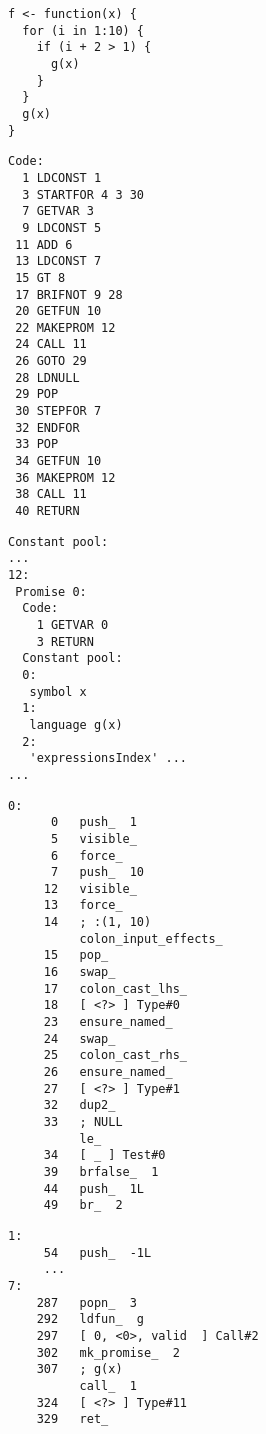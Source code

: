 \begin{listing}[p]
	\centering
		\begin{minipage}{0.33\textwidth}
			\begin{verbatim}
f <- function(x) {
  for (i in 1:10) {
    if (i + 2 > 1) {
      g(x)
    }
  }
  g(x)
}
    \end{verbatim}
			\label{lst:bc-example-r}
		\end{minipage}
		\hfill
    \begin{minipage}[t]{0.61\textwidth}
			\begin{minipage}{0.20\textwidth}
				\begin{verbatim}
Code:
  1 LDCONST 1
  3 STARTFOR 4 3 30
  7 GETVAR 3
  9 LDCONST 5
 11 ADD 6
 13 LDCONST 7
 15 GT 8
 17 BRIFNOT 9 28
 20 GETFUN 10
 22 MAKEPROM 12
 24 CALL 11
 26 GOTO 29
 28 LDNULL
 29 POP
 30 STEPFOR 7
 32 ENDFOR
 33 POP
 34 GETFUN 10
 36 MAKEPROM 12
 38 CALL 11
 40 RETURN
        \end{verbatim}
			\end{minipage}
			\hfill
      \begin{minipage}{0.40\textwidth}
				\begin{verbatim}
Constant pool:
...
12:
 Promise 0:
  Code:
    1 GETVAR 0
    3 RETURN
  Constant pool:
  0:
   symbol x
  1:
   language g(x)
  2:
   'expressionsIndex' ...
...
        \end{verbatim}
			\end{minipage}
			\label{lst:bc-example-gnur}
		\end{minipage}
	\par\vspace{2mm}\par
	\begin{minipage}{\textwidth}
		\centering
		\begin{minipage}{0.47\textwidth}
			\begin{verbatim}
0:
      0   push_  1
      5   visible_
      6   force_
      7   push_  10
     12   visible_
     13   force_
     14   ; :(1, 10)
          colon_input_effects_
     15   pop_
     16   swap_
     17   colon_cast_lhs_
     18   [ <?> ] Type#0
     23   ensure_named_
     24   swap_
     25   colon_cast_rhs_
     26   ensure_named_
     27   [ <?> ] Type#1
     32   dup2_
     33   ; NULL
          le_
     34   [ _ ] Test#0
     39   brfalse_  1
     44   push_  1L
     49   br_  2
      \end{verbatim}
		\end{minipage}
		\hfill
		\begin{minipage}{0.47\textwidth}
			\begin{verbatim}
1:
     54   push_  -1L
     ...
7:
    287   popn_  3
    292   ldfun_  g
    297   [ 0, <0>, valid  ] Call#2
    302   mk_promise_  2
    307   ; g(x)
          call_  1
    324   [ <?> ] Type#11
    329   ret_


\end{verbatim}
\end{minipage}
\end{minipage}
\end{listing}
